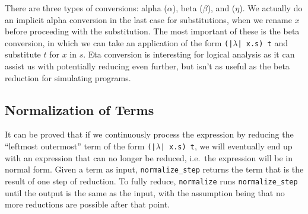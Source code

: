 \documentclass[12pt,letterpaper]{article}
\begin{document}
There are three types of conversions: alpha ($\alpha$), beta ($\beta$), and ($\eta$).
We actually do an implicit alpha conversion in the last case for substitutions, when we rename $x$ before proceeding with the substitution.
The most important of these is the beta conversion, in which we can take an application of the form \texttt{(|$\lambda$| x.s) t} and substitute $t$ for $x$ in $s$.
Eta conversion is interesting for logical analysis as it can assist us with potentially reducing even further, but isn't as useful as the beta reduction for simulating programs.

\subsection{Normalization of Terms}

It can be proved that if we continuously process the expression by reducing the \enquote{leftmost outermost} term of the form \texttt{(|$\lambda$| x.s) t}, we will eventually end up with an expression that can no longer be reduced, i.e.\ the expression will be in normal form.
Given a term as input, \texttt{normalize_step} returns the term that is the result of one step of reduction.
To fully reduce, \texttt{normalize} runs \texttt{normalize_step} until the output is the same as the input, with the assumption being that no more reductions are possible after that point.
\end{document}
